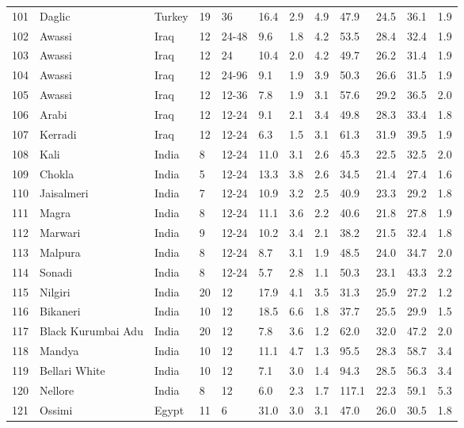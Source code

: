 \begin{center}
\begin{landscape}
\begin{longtable}{|p{0.4in}|p{0.9in}|p{0.7in}|p{0.5in}|p{0.5in}|p{0.5in}|p{0.5in}|p{0.5in}|p{0.5in}|p{0.5in}|p{0.5in}|p{0.5in}|}
 101 &  Daglic &  Turkey & 19 &  36 & 16.4 & 2.9 & 4.9 & 47.9 & 24.5 & 36.1 & 1.9 \\ 
 102 &  Awassi &  Iraq & 12 &  24-48 & 9.6 & 1.8 & 4.2 & 53.5 & 28.4 & 32.4 & 1.9 \\ 
 103 &  Awassi &  Iraq & 12 &  24 & 10.4 & 2.0 & 4.2 & 49.7 & 26.2 & 31.4 & 1.9 \\ 
 104 &  Awassi &  Iraq & 12 &  24-96 & 9.1 & 1.9 & 3.9 & 50.3 & 26.6 & 31.5 & 1.9 \\ 
 105 &  Awassi &  Iraq & 12 &  12-36 & 7.8 & 1.9 & 3.1 & 57.6 & 29.2 & 36.5 & 2.0 \\ 
 106 &  Arabi &  Iraq & 12 &  12-24 & 9.1 & 2.1 & 3.4 & 49.8 & 28.3 & 33.4 & 1.8 \\ 
 107 &  Kerradi &  Iraq & 12 &  12-24 & 6.3 & 1.5 & 3.1 & 61.3 & 31.9 & 39.5 & 1.9 \\ 
 108 &  Kali &  India &  8 &  12-24 & 11.0 & 3.1 & 2.6 & 45.3 & 22.5 & 32.5 & 2.0 \\ 
 109 &  Chokla &  India &  5 &  12-24 & 13.3 & 3.8 & 2.6 & 34.5 & 21.4 & 27.4 & 1.6 \\ 
 110 &  Jaisalmeri &  India &  7 &  12-24 & 10.9 & 3.2 & 2.5 & 40.9 & 23.3 & 29.2 & 1.8 \\ 
 111 &  Magra &  India &  8 &  12-24 & 11.1 & 3.6 & 2.2 & 40.6 & 21.8 & 27.8 & 1.9 \\ 
 112 &  Marwari &  India &  9 &  12-24 & 10.2 & 3.4 & 2.1 & 38.2 & 21.5 & 32.4 & 1.8 \\ 
 113 &  Malpura &  India &  8 &  12-24 & 8.7 & 3.1 & 1.9 & 48.5 & 24.0 & 34.7 & 2.0 \\ 
 114 &  Sonadi &  India &  8 &  12-24 & 5.7 & 2.8 & 1.1 & 50.3 & 23.1 & 43.3 & 2.2 \\ 
 115 &  Nilgiri &  India & 20 &  12 & 17.9 & 4.1 & 3.5 & 31.3 & 25.9 & 27.2 & 1.2 \\ 
 116 &  Bikaneri &  India & 10 &  12 & 18.5 & 6.6 & 1.8 & 37.7 & 25.5 & 29.9 & 1.5 \\ 
 117 &  Black Kurumbai Adu &  India & 20 &  12 & 7.8 & 3.6 & 1.2 & 62.0 & 32.0 & 47.2 & 2.0 \\ 
 118 &  Mandya &  India & 10 &  12 & 11.1 & 4.7 & 1.3 & 95.5 & 28.3 & 58.7 & 3.4 \\ 
 119 &  Bellari White &  India & 10 &  12 & 7.1 & 3.0 & 1.4 & 94.3 & 28.5 & 56.3 & 3.4 \\ 
 120 &  Nellore &  India &  8 &  12 & 6.0 & 2.3 & 1.7 & 117.1 & 22.3 & 59.1 & 5.3 \\ 
 121 &  Ossimi &  Egypt & 11 &  6 & 31.0 & 3.0 & 3.1 & 47.0 & 26.0 & 30.5 & 1.8 \\ 

\end{longtable}
\end{landscape}
\end{center}
